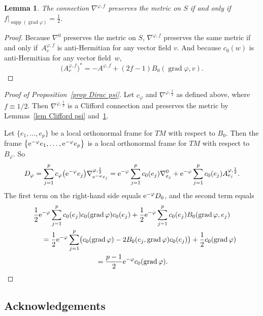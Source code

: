 \documentclass[pdftex]{sigma}%
\numberwithin{equation}{section}
\newtheorem{Lemma}[Theorem]{Lemma}
\DeclareMathOperator{\grad}{grad}
\DeclareMathOperator{\supp}{supp}
\begin{document}
\begin{Lemma}\label{lem pres metric}
The connection $\nabla^{\varphi,f}$ preserves the metric on $S$ if and only if $f|_{\supp(\grad \varphi)} = \frac{1}{2}$.
\end{Lemma}
\begin{proof}
Because $\nabla^0$ preserves the metric on $S$, $\nabla^{\varphi,f}$ preserves the same metric if and only if~$A^{\varphi,f}_v$ is anti-Hermitian for any vector field $v$. And because $c_0(w)$ is anti-Hermitian for any vector field~$w$,
\begin{equation*}
\big(A^{\varphi,f}_v\big)^* = -A^{\varphi,f} + (2f-1)B_0(\grad \varphi, v).\tag*{\qed}
\end{equation*}
\renewcommand{\qed}{}
\end{proof}

\begin{proof}[Proof of Proposition~\ref{prop Dirac psi}]
Let $c_{\varphi}$ and $\nabla^{\varphi, \frac{1}{2}}$ as defined above, where $f \equiv 1/2$. Then $\nabla^{\varphi, \frac{1}{2}}$ is a Clifford connection and preserves the metric by Lemmas~\ref{lem Clifford psi} and~\ref{lem pres metric}.

Let $\{e_1, \dots, e_p\}$ be a local orthonormal frame for $TM$ with respect to $B_0$. Then the frame $\big\{{\rm e}^{-\varphi} e_1, \dots, {\rm e}^{-\varphi} e_p\big\}$ is a local orthonormal frame for $TM$ with respect to $B_{\varphi}$. So
\[
D_{\varphi} = \sum_{j=1}^p c_{\varphi}\big({\rm e}^{-\varphi}e_j\big) \nabla^{\varphi, \frac{1}{2}}_{{\rm e}^{-\varphi} e_j}
= {\rm e}^{-\varphi} \sum_{j=1}^p c_0(e_j) \nabla^0_{e_j}
+{\rm e}^{-\varphi} \sum_{j=1}^p c_0(e_j) A^{\varphi, \frac{1}{2}}_{e_j}.
\]
The first term on the right-hand side equals ${\rm e}^{-\varphi} D_0$, and the second term equals
\begin{gather*}
\frac{1}{2}{\rm e}^{-\varphi} \sum_{j=1}^p c_0(e_j) c_0(\grad \varphi) c_0(e_j)
+\frac{1}{2}{\rm e}^{-\varphi} \sum_{j=1}^p c_0(e_j) B_0(\grad \varphi,e_j)\\
 \qquad{} =
\frac{1}{2}{\rm e}^{-\varphi} \sum_{j=1}^p\bigl( c_0(\grad \varphi) -2 B_0(e_j, \grad \varphi)c_0(e_j)\bigr) + \frac{1}{2} c_0(\grad \varphi)\\
\qquad{}
=\frac{p-1}{2}{\rm e}^{-\varphi} c_0(\grad \varphi). \tag*{\qed}
\end{gather*}
\renewcommand{\qed}{}
\end{proof}

\subsection*{Acknowledgements}
\end{document}
